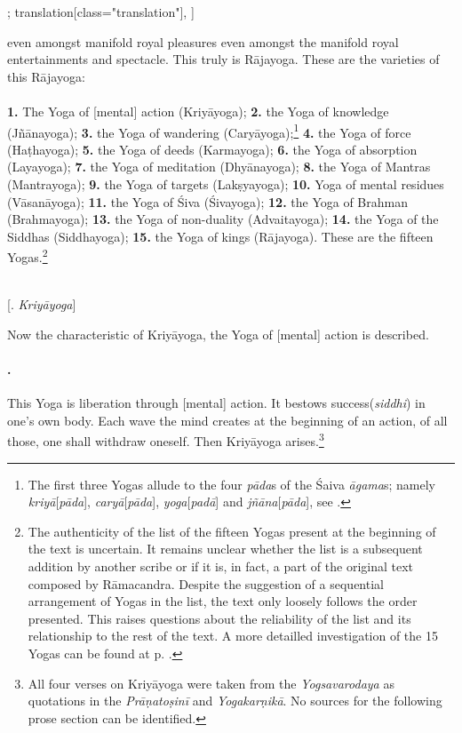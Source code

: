 \begin{alignment}[
    texts=edition[class="edition"];
    translation[class="translation"],
  ]
\begin{translation}
\begin{tlate}
[and] even amongst manifold royal pleasures even amongst the manifold royal entertainments and spectacle.\textsuperscript{} This truly is Rājayoga. These are the varieties of this Rājayoga:\\\\
\indent \textbf{1.} The Yoga of [mental] action (Kriyāyoga); \textbf{2.} the Yoga of knowledge (Jñānayoga); \textbf{3.} the Yoga of wandering (Caryāyoga);\footnote{The first three Yogas allude to the four \textit{pāda}s of the Śaiva \textit{āgama}s; namely \textit{kriyā}[\textit{pāda}], \textit{caryā}[\textit{pāda}], \textit{yoga}[\textit{padā}] and \textit{jñāna}[\textit{pāda}], see \citeauthor[2015: 77]{nishvasa2015}.} \textbf{4.} the Yoga of force (Haṭhayoga); \textbf{5.} the Yoga of deeds (Karmayoga); \textbf{6.} the Yoga of absorption (Layayoga); \textbf{7.} the Yoga of meditation (Dhyānayoga); \textbf{8.} the Yoga of Mantras (Mantrayoga); \textbf{9.} the Yoga of targets (Lakṣyayoga); \textbf{10.} Yoga of mental residues (Vāsanāyoga); \textbf{11.} the Yoga of Śiva (Śivayoga); \textbf{12.} the Yoga of Brahman (Brahmayoga); \textbf{13.} the Yoga of non-duality (Advaitayoga); \textbf{14.} the Yoga of the Siddhas (Siddhayoga); \textbf{15.} the Yoga of kings (Rājayoga). These are the fifteen Yogas.\textsuperscript{\coro{[\lowroman{10}]}}\footnote{The authenticity of the list of the fifteen Yogas present at the beginning of the text is uncertain. It remains unclear whether the list is a subsequent addition by another scribe or if it is, in fact, a part of the original text composed by Rāmacandra. Despite the suggestion of a sequential arrangement of Yogas in the list, the text only loosely follows the order presented. This raises questions about the reliability of the list and its relationship to the rest of the text. A more detailled investigation of the 15 Yogas can be found at p. \pageref{yogas_list}.}\\\\
      \bigskip 
      \centerline{\textrm{\small{[.\textsuperscript{} \textit{Kriyāyoga}]}}}
      \label{kriyayogatrans}
      \bigskip
      \indent Now the characteristic of Kriyāyoga, the Yoga of [mental] action is described. \paragraph{\textsuperscript{}.} This Yoga is liberation through [mental] action. It bestows success(\textit{siddhi}) in one's own body. Each wave the mind creates at the beginning of an action, of all those, one shall withdraw oneself. Then Kriyāyoga arises.\footnote{All four verses on Kriyāyoga were taken from the \textit{Yogsavarodaya} as quotations in the \textit{Prāṇatoṣinī} and \textit{Yogakarṇikā}. No sources for the following prose section can be identified.}\vspace*{\fill}
      \vfill
\end{tlate}
 \ekdpb*{}
   \end{translation}
 \end{alignment}
